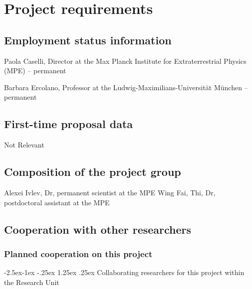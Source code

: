 \documentclass[10pt,fleqn,twoside]{article}
\makeatletter
\newcommand{\Tcol}{\color{blue}}
\renewcommand\paragraph{\@startsection{paragraph}{4}{\z@}%
            {-2.5ex\@plus -1ex \@minus -.25ex}%
            {1.25ex \@plus .25ex}%
            {\normalfont\normalsize\bfseries}}
\makeatother
\begin{document}
\section{\Tcol Project requirements}
\renewcommand{\leftmark}{\sc Project requirements}

\subsection{\Tcol Employment status information}

Paola Caselli, Director at the Max Planck Institute for Extraterrestrial Physics (MPE) -- permanent 

Barbara Ercolano, Professor at the Ludwig-Maximilians-Universit\"at
M\"unchen -- permanent

\subsection{\Tcol First-time proposal data}

Not Relevant

\subsection{\Tcol Composition of the project group}

Alexei Ivlev, Dr, permanent scientist at the MPE 
Wing Fai, Thi, Dr, postdoctoral assistant at the MPE

\subsection{\Tcol Cooperation with other researchers}

\subsubsection{\Tcol Planned cooperation on this project}

\paragraph{\Tcol Collaborating researchers for this project within the
  Research Unit}
\end{document}
